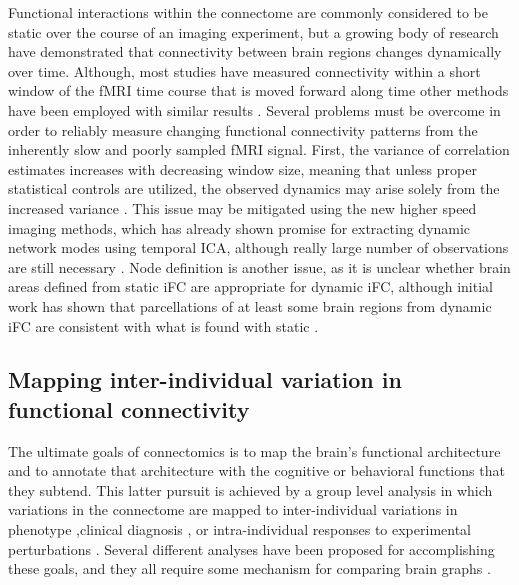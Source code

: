 \documentclass{bmcart}
\begin{document}
Functional interactions within the connectome are commonly considered to be static over the course of an imaging experiment, but a growing body of research have demonstrated that connectivity between brain regions changes dynamically over time\cite{Hutchison2013}. Although, most studies have measured connectivity within a short window of the fMRI time course that is moved forward along time \cite{Keilholz2013,Chang2010,Yang2014,Allen2014} other methods have been employed with similar results  \cite{Majeed2011,Smith2012}. Several problems must be overcome in order to reliably measure changing functional connectivity patterns from the inherently slow and poorly sampled fMRI signal. First, the variance of correlation estimates increases with decreasing window size, meaning that unless proper statistical controls are utilized, the observed dynamics may arise solely from the increased variance \cite{Handwerker2012}. This issue may be mitigated using the new higher speed imaging methods, which has already shown promise for extracting dynamic network modes using temporal ICA, although really large number of observations are still necessary \cite{Smith2012}. Node definition is another issue, as it is unclear whether brain areas defined from static iFC are appropriate for dynamic iFC, although initial work has shown that parcellations of at least some brain regions from dynamic iFC are consistent with what is found with static \cite{Yang2014}.

\subsection{Mapping inter-individual variation in functional connectivity} 

The ultimate goals of connectomics is to map the brain's functional architecture and to annotate that architecture with the cognitive or behavioral functions that they subtend. This latter pursuit is achieved by a group level analysis in which variations in the connectome are mapped to inter-individual variations in phenotype  \cite{Kelly2012},clinical diagnosis \cite{Castellanos2013}, or intra-individual responses to experimental perturbations \cite{Shirer2012}. Several different analyses have been proposed for accomplishing these goals, and they all require some mechanism for comparing brain graphs \cite{Varoquaux2013}. 
 
\end{document}
